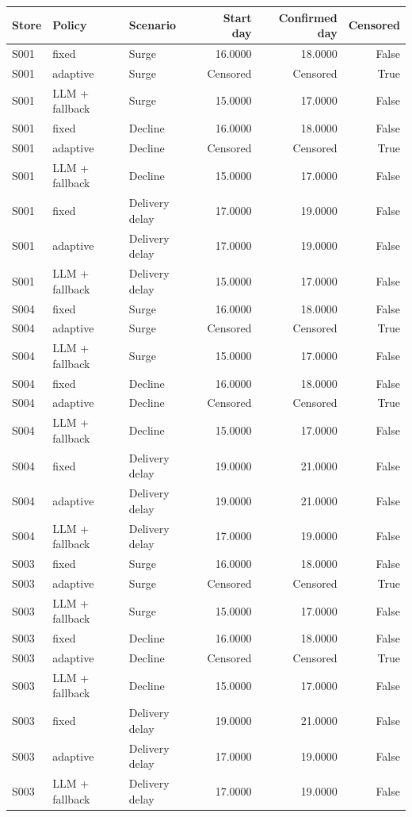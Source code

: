 \begin{tabular}{lllrrr}
\toprule
Store & Policy & Scenario & Start day & Confirmed day & Censored \\
\midrule
S001 & fixed & Surge & 16.0000 & 18.0000 & False \\
S001 & adaptive & Surge & Censored & Censored & True \\
S001 & LLM + fallback & Surge & 15.0000 & 17.0000 & False \\
S001 & fixed & Decline & 16.0000 & 18.0000 & False \\
S001 & adaptive & Decline & Censored & Censored & True \\
S001 & LLM + fallback & Decline & 15.0000 & 17.0000 & False \\
S001 & fixed & Delivery delay & 17.0000 & 19.0000 & False \\
S001 & adaptive & Delivery delay & 17.0000 & 19.0000 & False \\
S001 & LLM + fallback & Delivery delay & 15.0000 & 17.0000 & False \\
S004 & fixed & Surge & 16.0000 & 18.0000 & False \\
S004 & adaptive & Surge & Censored & Censored & True \\
S004 & LLM + fallback & Surge & 15.0000 & 17.0000 & False \\
S004 & fixed & Decline & 16.0000 & 18.0000 & False \\
S004 & adaptive & Decline & Censored & Censored & True \\
S004 & LLM + fallback & Decline & 15.0000 & 17.0000 & False \\
S004 & fixed & Delivery delay & 19.0000 & 21.0000 & False \\
S004 & adaptive & Delivery delay & 19.0000 & 21.0000 & False \\
S004 & LLM + fallback & Delivery delay & 17.0000 & 19.0000 & False \\
S003 & fixed & Surge & 16.0000 & 18.0000 & False \\
S003 & adaptive & Surge & Censored & Censored & True \\
S003 & LLM + fallback & Surge & 15.0000 & 17.0000 & False \\
S003 & fixed & Decline & 16.0000 & 18.0000 & False \\
S003 & adaptive & Decline & Censored & Censored & True \\
S003 & LLM + fallback & Decline & 15.0000 & 17.0000 & False \\
S003 & fixed & Delivery delay & 19.0000 & 21.0000 & False \\
S003 & adaptive & Delivery delay & 17.0000 & 19.0000 & False \\
S003 & LLM + fallback & Delivery delay & 17.0000 & 19.0000 & False \\
\bottomrule
\end{tabular}
